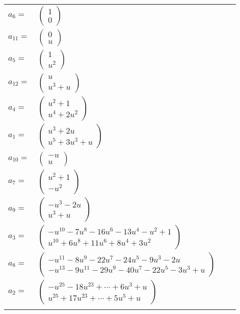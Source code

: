 \documentclass[1p]{elsarticle_modified}
\theoremstyle{definition}
\begin{document}
\begin{tabular}{m{7pt} m{180pt} m{7pt} m{180pt} }
\flushright $a_{6}=$&$\begin{pmatrix}1\\0\end{pmatrix}$ \\
\flushright $a_{11}=$&$\begin{pmatrix}0\\u\end{pmatrix}$ \\
\flushright $a_{5}=$&$\begin{pmatrix}1\\u^2\end{pmatrix}$ \\
\flushright $a_{12}=$&$\begin{pmatrix}u\\u^3+u\end{pmatrix}$ \\
\flushright $a_{4}=$&$\begin{pmatrix}u^2+1\\u^4+2 u^2\end{pmatrix}$ \\
\flushright $a_{1}=$&$\begin{pmatrix}u^3+2 u\\u^5+3 u^3+u\end{pmatrix}$ \\
\flushright $a_{10}=$&$\begin{pmatrix}- u\\u\end{pmatrix}$ \\
\flushright $a_{7}=$&$\begin{pmatrix}u^2+1\\- u^2\end{pmatrix}$ \\
\flushright $a_{9}=$&$\begin{pmatrix}- u^3-2 u\\u^3+u\end{pmatrix}$ \\
\flushright $a_{3}=$&$\begin{pmatrix}- u^{10}-7 u^8-16 u^6-13 u^4- u^2+1\\u^{10}+6 u^8+11 u^6+8 u^4+3 u^2\end{pmatrix}$ \\
\flushright $a_{8}=$&$\begin{pmatrix}- u^{11}-8 u^9-22 u^7-24 u^5-9 u^3-2 u\\- u^{13}-9 u^{11}-29 u^9-40 u^7-22 u^5-3 u^3+u\end{pmatrix}$ \\
\flushright $a_{2}=$&$\begin{pmatrix}- u^{25}-18 u^{23}+\cdots+6 u^3+u\\u^{25}+17 u^{23}+\cdots+5 u^5+u\end{pmatrix}$\\&\end{tabular}
\end{document}
